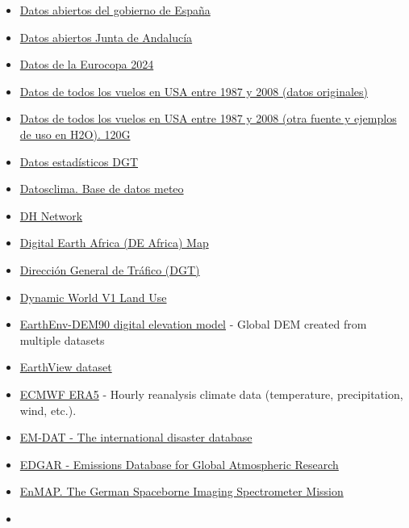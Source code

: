\documentclass[
]{article}
\begin{document}
\begin{itemize}
\item
  \href{http://datos.gob.es/}{Datos abiertos del gobierno de España}
\item
  \href{http://www.juntadeandalucia.es/datosabiertos/portal.html}{Datos
  abiertos Junta de Andalucía}
\item
  \href{https://github.com/Jelagmil/Euro2024_data}{Datos de la Eurocopa
  2024}
\item
  \href{http://stat-computing.org/dataexpo/2009/the-data.html}{Datos de
  todos los vuelos en USA entre 1987 y 2008 (datos originales)}
\item
  \href{https://github.com/h2oai/h2o-2/wiki/Hacking-Airline-DataSet-with-H2O}{Datos
  de todos los vuelos en USA entre 1987 y 2008 (otra fuente y ejemplos
  de uso en H2O). 120G}
\item
  \href{https://sedeapl.dgt.gob.es/WEB_IEST_CONSULTA/}{Datos
  estadísticos DGT}
\item
  \href{http://datosclima.es/Aemet2013/DescargaDatos.html}{Datosclima.
  Base de datos meteo}
\item
  \href{http://opendhn.dhnetwork.opendata.arcgis.com/}{DH Network}
\item
  \href{https://www.digitalearthafrica.org/platform-resources/platform}{Digital
  Earth Africa (DE Africa) Map}
\item
  \href{https://sedeapl.dgt.gob.es/WEB_IEST_CONSULTA/inicio.faces}{Dirección
  General de Tráfico (DGT)}
\item
  \href{https://developers.google.com/earth-engine/datasets/catalog/GOOGLE_DYNAMICWORLD_V1}{Dynamic
  World V1 Land Use}
\item
  \href{https://www.earthenv.org/DEM}{EarthEnv-DEM90 digital elevation
  model} - Global DEM created from multiple datasets
\item
  \href{https://huggingface.co/datasets/satellogic/EarthView}{EarthView
  dataset}
\item
  \href{https://www.ecmwf.int/en/forecasts/dataset/ecmwf-reanalysis-v5}{ECMWF
  ERA5} - Hourly reanalysis climate data (temperature, precipitation,
  wind, etc.).
\item
  \href{https://www.emdat.be/}{EM-DAT - The international disaster
  database}
\item
  \href{https://edgar.jrc.ec.europa.eu/emissions_data_and_maps}{EDGAR -
  Emissions Database for Global Atmospheric Research}
\item
  \href{https://www.enmap.org/}{EnMAP. The German Spaceborne Imaging
  Spectrometer Mission}
\item

\end{itemize}
\end{document}
